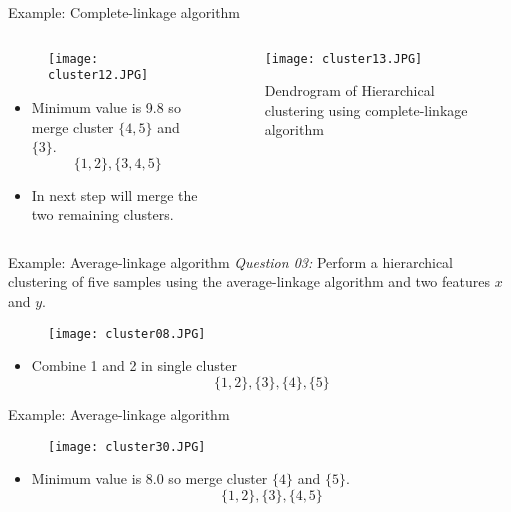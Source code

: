 \begin{frame}{Example: Complete-linkage algorithm}
\begin{columns}
\begin{column}{5cm}
\begin{figure}
\texttt{[image: cluster12.JPG]}
\end{figure}
\begin{itemize}
\item Minimum value is 9.8 so merge cluster $\{4,5\}$ and $\{3\}$.
\begin{equation}
\{1,2\},\{3,4,5\}\nonumber
\end{equation}
\item In next step will merge the two remaining clusters.
\end{itemize}
\end{column}
\begin{column}{5.5cm}
\begin{figure}
\texttt{[image: cluster13.JPG]}
\caption{Dendrogram of Hierarchical clustering using complete-linkage algorithm}
\end{figure}
\end{column}
\end{columns}
\end{frame}

\begin{frame}{Example: Average-linkage algorithm}
\textit{\color{slidecolor}Question 03:} Perform a hierarchical clustering of five samples using the average-linkage algorithm and two features $x$ and $y$.
\begin{figure}
\texttt{[image: cluster08.JPG]}
\end{figure}
\begin{itemize}
\item Combine 1 and 2 in single cluster
\begin{equation}
\{1,2\},\{3\},\{4\},\{5\}\nonumber
\end{equation}
\end{itemize}
\end{frame}

\begin{frame}{Example: Average-linkage algorithm}
\begin{figure}
\texttt{[image: cluster30.JPG]}
\end{figure}
\begin{itemize}
\item Minimum value is 8.0 so merge cluster $\{4\}$ and $\{5\}$.
\begin{equation}
\{1,2\},\{3\},\{4,5\}\nonumber
\end{equation}
\end{itemize}
\end{frame}

